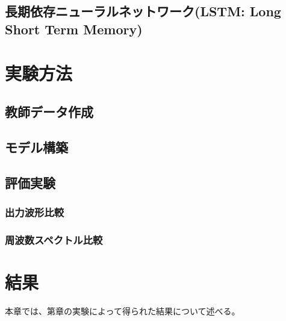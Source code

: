 \documentclass{jreport}		%
\begin{document}
\section{長期依存ニューラルネットワーク(LSTM: Long Short Term Memory)}

\chapter{実験方法}
\section{教師データ作成}

\section{モデル構築}

\section{評価実験}
\subsection{出力波形比較}

\subsection{周波数スペクトル比較}

\chapter{結果}
本章では、第章の実験によって得られた結果について述べる。
\end{document}
